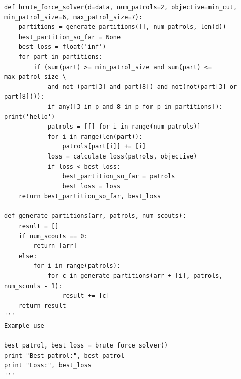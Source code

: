 \documentclass{amsart}
\theoremstyle{definition}
\theoremstyle{remark}
\numberwithin{equation}{section}
\begin{document}
\begin{thebibliography}{10}
\begin{lstlisting}
def brute_force_solver(d=data, num_patrols=2, objective=min_cut, min_patrol_size=6, max_patrol_size=7):
	partitions = generate_partitions([], num_patrols, len(d))
	best_partition_so_far = None
	best_loss = float('inf')
	for part in partitions:
		if (sum(part) >= min_patrol_size and sum(part) <= max_patrol_size \
			and not (part[3] and part[8]) and not(not(part[3] or part[8]))):
			if any([3 in p and 8 in p for p in partitions]): print('hello')
			patrols = [[] for i in range(num_patrols)]
			for i in range(len(part)):
				patrols[part[i]] += [i]
			loss = calculate_loss(patrols, objective)	
			if loss < best_loss:
				best_partition_so_far = patrols
				best_loss = loss
	return best_partition_so_far, best_loss

def generate_partitions(arr, patrols, num_scouts):
	result = []
	if num_scouts == 0:
		return [arr]
	else:
		for i in range(patrols):
			for c in generate_partitions(arr + [i], patrols, num_scouts - 1):
				result += [c]
	return result
'''
Example use

best_patrol, best_loss = brute_force_solver()
print "Best patrol:", best_patrol
print "Loss:", best_loss
'''
\end{lstlisting}
\end{thebibliography}
\end{document}

